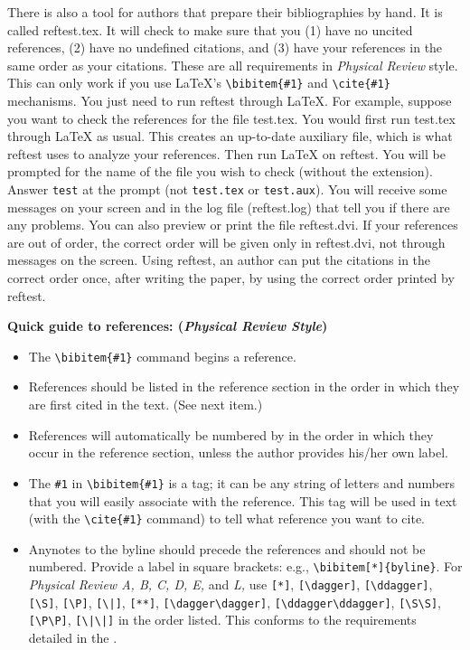 There is also a tool for authors that prepare their bibliographies by hand.
It is called reftest.tex. It will check to make sure that you (1) have no
uncited references, (2) have no undefined citations, and (3) have your
references in the same order as your citations. These are all requirements
in {\it Physical Review\/} style. This can only work if you use \LaTeX{}'s
\verb+\bibitem{#1}+ and \verb+\cite{#1}+ mechanisms. You just need to run
reftest through \LaTeX{}. For example, suppose you want to check the
references for the file test.tex. You would first run test.tex through
\LaTeX{} as usual. This creates an up-to-date auxiliary file, which is what
reftest uses to analyze your references. Then run \LaTeX{} on reftest. You
will be prompted for the name of the file you wish to check (without the
extension). Answer \verb+test+ at the prompt (not \verb+test.tex+ or
\verb+test.aux+). You will receive some messages on your screen and in the
log file (reftest.log) that tell you if there are any problems. You can
also preview or print the file reftest.dvi. If your references are out of
order, the correct order will be given only in reftest.dvi, not through
messages on the screen. Using reftest, an author can put the citations in
the correct order once, after writing the paper, by using the correct order
printed by reftest.

\bigskip

{\bf Quick guide to references: ({\em Physical Review Style})}

\begin{itemize}
\item The \verb+\bibitem{#1}+ command begins a reference.

\item  References should be listed in the reference section in the order in
which they are first cited in the text. (See next item.)

\item  References will automatically be numbered by \REVTeX{} in the order
in which they occur in the reference section, unless the author provides
his/her own label.

\item  The \verb+#1+ in \verb+\bibitem{#1}+ is a tag; it can be any string
of letters and numbers that you will easily associate with the reference.
This tag will be used in text (with the \verb+\cite{#1}+ command) to tell
\REVTeX{} what reference you want to cite.

\item  Anynotes to the byline should precede the references and should not
be numbered.  Provide a label in square brackets: e.g.,
\verb+\bibitem[*]{byline}+. For {\em Physical Review A, B, C, D, E,} and
{\em L,} use \verb+[*]+, \verb+[\dagger]+,  \verb+[\ddagger]+,
\verb+[\S]+, \verb+[\P]+, \verb+[\|]+, 
\verb+[**]+, \verb+[\dagger\dagger]+,  \verb+[\ddagger\ddagger]+, 
\verb+[\S\S]+, \verb+[\P\P]+, \verb+[\|\|]+ in the
order listed. This conforms to the requirements detailed in the \SNG{}.

\end{itemize}

